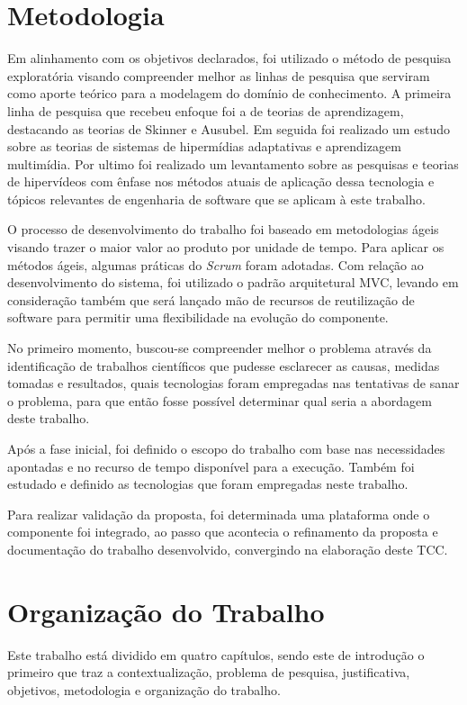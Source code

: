 \section{Metodologia}

Em alinhamento com os objetivos declarados, foi utilizado o método de pesquisa exploratória visando compreender melhor as linhas de pesquisa que serviram como aporte teórico para a modelagem do domínio de conhecimento. A primeira linha de pesquisa que recebeu enfoque foi a de teorias de aprendizagem, destacando as teorias de Skinner e Ausubel. Em seguida foi realizado um estudo sobre as teorias de sistemas de hipermídias adaptativas e aprendizagem multimídia. Por ultimo foi realizado um levantamento sobre as pesquisas e teorias de hipervídeos com ênfase nos métodos atuais de aplicação dessa tecnologia e tópicos relevantes de engenharia de software que se aplicam à este trabalho.

O processo de desenvolvimento do trabalho foi baseado em metodologias ágeis visando trazer o maior valor ao produto por unidade de tempo. Para aplicar os métodos ágeis, algumas práticas do \textit{Scrum} foram adotadas. Com relação ao desenvolvimento do sistema, foi utilizado o padrão arquitetural MVC, levando em consideração também que será lançado mão de recursos de reutilização de software para permitir uma flexibilidade na evolução do componente.

No primeiro momento, buscou-se compreender melhor o problema através da identificação de trabalhos científicos que pudesse esclarecer as causas, medidas tomadas e resultados, quais tecnologias foram empregadas nas tentativas de sanar o problema, para que então fosse possível determinar qual seria a abordagem deste trabalho.

Após a fase inicial, foi definido o escopo do trabalho com base nas necessidades apontadas e no recurso de tempo disponível para a execução. Também foi estudado e definido as tecnologias que foram empregadas neste trabalho.

Para realizar validação da proposta, foi determinada uma plataforma onde o componente foi integrado, ao passo que acontecia o refinamento da proposta e documentação do trabalho desenvolvido, convergindo na elaboração deste TCC.

\section{Organização do Trabalho}

Este trabalho está dividido em quatro capítulos, sendo este de introdução o primeiro que traz a contextualização, problema de pesquisa, justificativa, objetivos, metodologia e organização do trabalho.


